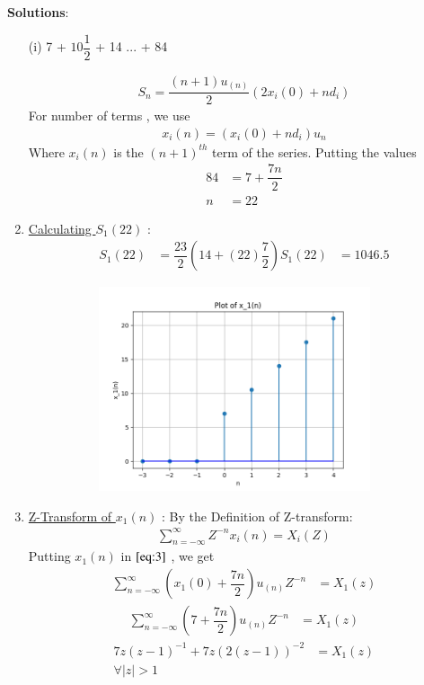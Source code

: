\documentclass[journal,12pt,twocolumn]{IEEEtran}
\theoremstyle{remark}
\begin{document}
\vspace{0.5cm}
\textbf{Solutions}:
\begin{enumerate}
\item[(i)]   
7 + $10\dfrac{1}{2}$ + 14 ... + 84
\vspace{0.2cm}

\begin{align}
{S_n} = \dfrac{(n+1)u_{(n)}}{2}(2x_i(0) + nd_i)\label{eq:1}
\end{align}
For number of terms , we use
\begin{align}
x_i(n) = (x_i(0) + nd_i)u_n\label{eq:2}
\end{align}
Where $x_i(n)$ is the $(n+1)^{th}$ term of the series. Putting the values
\begin{align}  
84 &= 7+\dfrac{7n}{2}\\
n &= 22
\end{align}
\item 
\underline{Calculating $S_1(22)$} : 
\begin{align}
    S_1{(22)} &= \dfrac{23}{2}(14+(22)\dfrac{7}{2})
    S_1{(22)} &= 1046.5
    \end{align} 
    \vspace{0.1cm}

    \begin{figure}[!ht]
    \centering
\graphicspath{ {figs/} }
\includegraphics[width=10cm, height=6cm]{graph_1}
\captionsetup{Graph:1 $x_1(n)$ vs n }
\end{figure}
\vspace{0.05cm}
\item 
\underline{Z-Transform of $x_1(n)$} :
\vspace{0.2cm}
By the Definition of Z-transform:
\begin{align}
 \sum_{n=-\infty}^{\infty} Z^{-n}x_i(n) = X_i(Z)\label{eq:3}
 \end{align}
\vspace{0.05cm}Putting $x_1(n)$ in $\eqref{eq:3}$ , we get \vspace{0.05cm}
\begin{align}
     \sum_{n=-\infty}^{\infty}(x_1(0) + \dfrac{7n}{2})u_{(n)}Z^{-n} &= X_1(z)
\end{align}
\begin{align}
\sum_{n=-\infty}^{\infty}(7 + \dfrac{7n}{2})u_{(n)}Z^{-n} &= X_1(z)
\end{align}
\begin{align}
7z(z-1)^{-1}+
7z(2(z-1))^{-2} &= X_1(z) \label{eq:4}\\
\forall \lvert z \rvert  >  1 
\end{align}
    

\end{enumerate}
\end{document}
